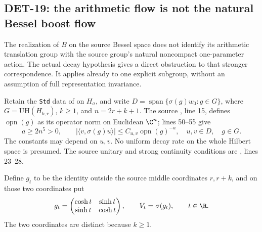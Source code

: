 \subsection{DET-19: the arithmetic flow is not the natural Bessel boost flow}
The realization of \(B\) on the source Bessel space does not identify
its arithmetic translation group with the source group's natural
noncompact one-parameter action. The actual decay hypothesis gives
a direct obstruction to that stronger correspondence. It applies
already to one explicit subgroup, without an assumption of full
representation invariance.

Retain the \texttt{Std} data of  on \(H_\sigma\), and
write \(D=\operatorname{span}\{\sigma(g)w_0:g\in G\}\), where
\(G=\mathrm{UH}(H_{k,r})\), \(k\ge1\), and \(n=2r+k+1\).
The source
,
line 15, defines \(\operatorname{opn}(g)\) as its operator norm on
Euclidean \(\C^n\); lines 50--55 give
\begin{equation}\label{eq:boost-source-decay}
 a\ge2n^5>0,\qquad
 |\langle v,\sigma(g)u\rangle|
 \le C_{u,v}\operatorname{opn}(g)^{-a},
 \quad u,v\in D,\quad g\in G.
\end{equation}
The constants may depend on \(u,v\). No uniform decay rate on
the whole Hilbert space is presumed. The source unitary and strong
continuity conditions are
,
lines 23--28.

Define \(g_t\) to be the identity outside the source middle
coordinates \(r,r+k\), and on those two coordinates put
\[
 g_t=\begin{pmatrix}\cosh t&\sinh t\\
                      \sinh t&\cosh t\end{pmatrix},\qquad
 V_t=\sigma(g_t),\qquad t\in\R.
\]
The two coordinates are distinct because \(k\ge1\).

